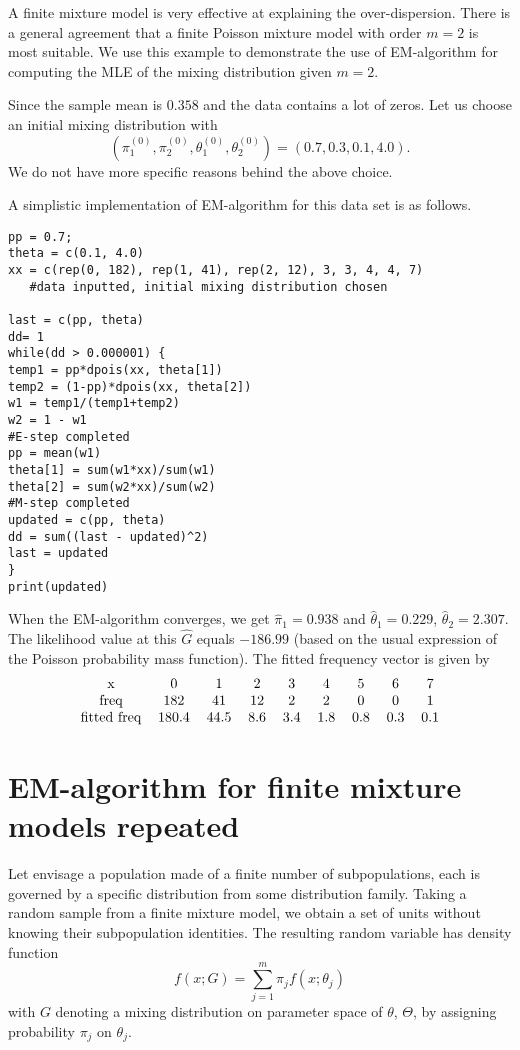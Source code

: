 A finite mixture model is very effective at explaining the
over-dispersion. There is a general agreement that a
finite Poisson mixture model with order $m=2$ is most
suitable. We use this example to demonstrate the use of
EM-algorithm for computing the MLE of the mixing
distribution given $m=2$.

Since the sample mean is $0.358$ and the data 
contains a lot of zeros. Let us choose an initial
mixing distribution with
\[
(\pi_1^{(0)}, \pi_2^{(0)}, \theta_1^{(0)}, \theta_2^{(0)})
=
(0.7, 0.3, 0.1, 4.0).
\]
We do not have more specific reasons behind the above choice.

A simplistic implementation of EM-algorithm for this
data set is as follows.

\begin{verbatim}
pp = 0.7;
theta = c(0.1, 4.0)
xx = c(rep(0, 182), rep(1, 41), rep(2, 12), 3, 3, 4, 4, 7)
   #data inputted, initial mixing distribution chosen

last = c(pp, theta)
dd= 1
while(dd > 0.000001) {
temp1 = pp*dpois(xx, theta[1])
temp2 = (1-pp)*dpois(xx, theta[2])
w1 = temp1/(temp1+temp2)
w2 = 1 - w1
#E-step completed
pp = mean(w1)
theta[1] = sum(w1*xx)/sum(w1)
theta[2] = sum(w2*xx)/sum(w2)
#M-step completed
updated = c(pp, theta)
dd = sum((last - updated)^2)
last = updated
}
print(updated)
\end{verbatim}


When the EM-algorithm converges, we get $\hat \pi_1 = 0.938$ and
$\hat \theta_1 = 0.229$, $\hat \theta_2 = 2.307$. The likelihood
value at this $\hat G$ equals $-186.99$ (based on the usual
expression of the Poisson probability mass function).
The fitted frequency vector is given by
\[
\begin{tabular}{ccccccccc}
x & 0 & 1 & 2 & 3 & 4& 5& 6 & 7\\
\mbox{freq}  & 182 & 41 & 12 & 2 &2 & 0& 0 & 1\\
\mbox{fitted freq} & 180.4 & 44.5 & 8.6 & 3.4 &1.8 & 0.8& 0.3 & 0.1
\end{tabular}
\]


\section{EM-algorithm for finite mixture models repeated}
Let envisage a population made of a finite number of subpopulations, 
each is governed by a specific distribution from some distribution family.
Taking a random sample from a finite mixture model, we obtain
a set of units without knowing their subpopulation identities.
The resulting random variable has density function
\[
f(x; G)  = \sum_{j=1}^m \pi_j f(x; \theta_j)
\]
with $G$ denoting a mixing distribution on parameter space
of $\theta$, $\Theta$, by assigning probability $\pi_j$ on $\theta_j$.

